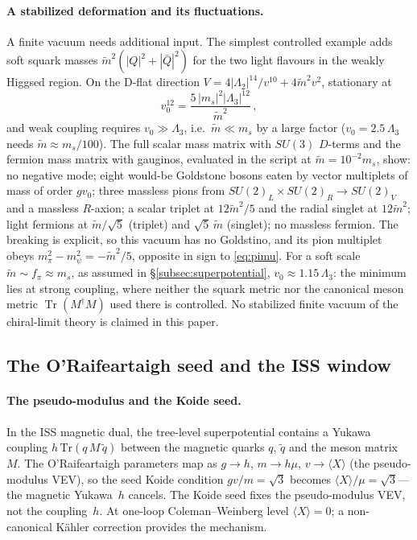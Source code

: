 \documentclass[12pt,a4paper]{article}
\newcommand{\fpi}{f_\pi}
\begin{document}
\paragraph{A stabilized deformation and its fluctuations.}
A finite vacuum needs additional input. The simplest controlled example
adds soft squark masses $\tilde m^2(|Q|^2 + |\bar Q|^2)$ for the two
light flavours in the weakly Higgsed region. On the D-flat direction
$V = 4|\Lambda_2|^{14}/v^{10} + 4\tilde m^2 v^2$, stationary at
\begin{equation*}
v_0^{12} = \frac{5\,|m_s|^2|\Lambda_3|^{12}}{\tilde m^2}\,,
\end{equation*}
and weak coupling requires $v_0 \gg \Lambda_3$, i.e.\
$\tilde m \ll m_s$ by a large factor ($v_0 = 2.5\,\Lambda_3$ needs
$\tilde m \approx m_s/100$). The full scalar mass matrix with $SU(3)$
$D$-terms and the fermion mass matrix with gauginos, evaluated in the
script at $\tilde m = 10^{-2}m_s$, show: no negative mode; eight
would-be Goldstone bosons eaten by vector multiplets of mass of order
$g v_0$; three massless pions from
$SU(2)_L\times SU(2)_R \to SU(2)_V$ and a massless $R$-axion; a scalar
triplet at $12\tilde m^2/5$ and the radial singlet at $12\tilde m^2$;
light fermions at $\tilde m/\sqrt5$ (triplet) and $\sqrt5\,\tilde m$
(singlet); no massless fermion. The breaking is explicit, so this vacuum
has no Goldstino, and its pion multiplet obeys
$m_\pi^2 - m_\psi^2 = -\tilde m^2/5$, opposite in sign to
\eqref{eq:pimu}. For a soft scale $\tilde m \sim \fpi \approx m_s$,
as assumed in \S\ref{subsec:superpotential}, $v_0 \approx
1.15\,\Lambda_3$: the minimum lies at strong coupling, where neither
the squark metric nor the canonical meson metric
$\operatorname{Tr}(M^\dagger M)$ used there is controlled. No
stabilized finite vacuum of the chiral-limit theory is claimed in this
paper.

\subsection{The O'Raifeartaigh seed and the ISS window}
\label{subsec:oraif_iss}

\paragraph{The pseudo-modulus and the Koide seed.}
In the ISS magnetic dual, the tree-level superpotential contains a
Yukawa coupling $h\,\mathrm{Tr}(q\,M\,\tilde q)$ between the magnetic
quarks $q$, $\tilde q$ and the meson matrix $M$. The O'Raifeartaigh
parameters map as $g \to h$, $m \to h\mu$, $v \to \langle X\rangle$
(the pseudo-modulus VEV), so the seed Koide condition
$gv/m = \sqrt{3}$ becomes $\langle X\rangle/\mu = \sqrt{3}$---the
magnetic Yukawa~$h$ cancels. The Koide seed fixes the
pseudo-modulus VEV, not the coupling~$h$.
At one-loop Coleman--Weinberg level $\langle X\rangle = 0$; a
non-canonical K\"ahler correction provides the mechanism.
\end{document}

